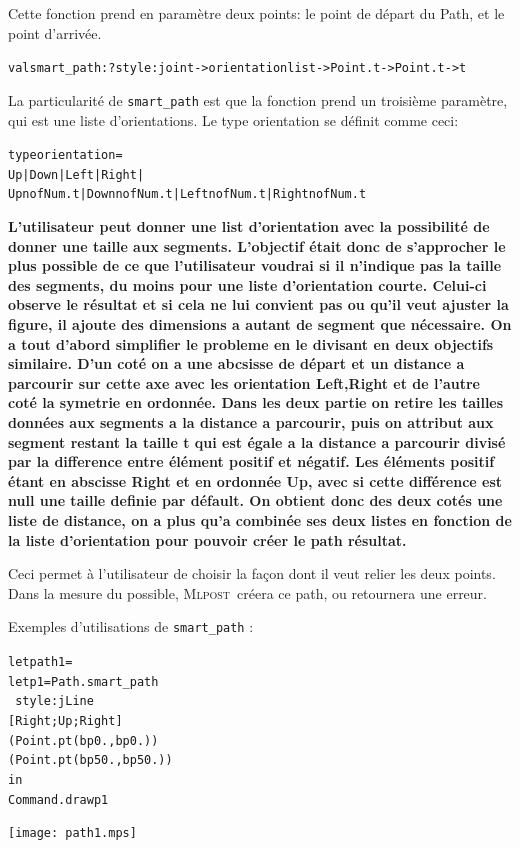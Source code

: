 \documentclass[a4paper,12pt]{article}
\newcommand{\mlpost}{\textsc{Mlpost}}
\begin{document}
Cette fonction prend en paramètre deux points: le point de départ du Path, et le point d'arrivée. 
\begin{alltt}
  val smart_path : ?style:joint -> orientation list -> Point.t -> Point.t -> t
\end{alltt}
\bigskip 

La particularité de \texttt{smart\_path} est que la fonction prend un troisième paramètre, qui est une liste d'orientations.
Le type orientation se définit comme ceci:
\begin{alltt}
  type orientation =
  Up | Down | Left | Right |
  Upn of Num.t | Downn of Num.t | Leftn of Num.t | Rightn of Num.t
\end{alltt}

\textbf{
L'utilisateur peut donner une list d'orientation avec la possibilité de donner une taille aux segments.
L'objectif était donc de s'approcher le plus possible de ce que l'utilisateur voudrai si il n'indique pas la taille des segments, du moins pour une liste d'orientation courte. 
Celui-ci observe le résultat et si cela ne lui convient pas ou qu'il veut ajuster la figure, il ajoute des dimensions a autant de segment que nécessaire.
On a tout d'abord simplifier le probleme en le divisant en deux objectifs similaire.
D'un coté on a une abcsisse de départ et un distance a parcourir sur cette axe avec les orientation Left,Right et de l'autre coté la symetrie en ordonnée.
Dans les deux partie on retire les tailles données aux segments a la distance a parcourir, puis on attribut aux segment restant la taille t qui est égale a la distance a parcourir divisé par la difference entre élément positif et négatif.
Les éléments positif étant en abscisse Right et en ordonnée Up, avec si cette différence est null une taille definie par défault. 
On obtient donc des deux cotés une liste de distance, on a plus qu'a combinée ses deux listes en fonction de la liste d'orientation pour pouvoir créer le path résultat.
}


Ceci permet à l'utilisateur de choisir la façon dont il veut relier les deux points. Dans la mesure du possible, \mlpost\ créera ce path, ou retournera une erreur. 
\bigskip 

Exemples d'utilisations de \texttt{smart\_path} :
\bigskip

\begin{minipage}{0.5\linewidth}
  \begin{alltt}
    let path1 = 
    let p1 = Path.smart_path 
    ~style:jLine
    [Right;Up;Right]
    (Point.pt (bp 0.,bp 0.)) 
    (Point.pt (bp 50.,bp 50.))
    in
    Command.draw p1
  \end{alltt}
\end{minipage}
\begin{minipage}{0.5\linewidth}
\begin{center}
\texttt{[image: path1.mps]}
\end{center}
\end{minipage}
\end{document}
